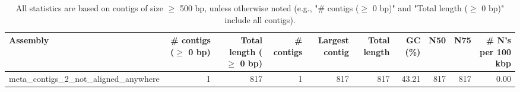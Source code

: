 \documentclass[12pt,a4paper]{article}
\begin{document}
\begin{table}[ht]
\begin{center}
\caption{All statistics are based on contigs of size $\geq$ 500 bp, unless otherwise noted (e.g., "\# contigs ($\geq$ 0 bp)" and "Total length ($\geq$ 0 bp)" include all contigs).}
\begin{tabular}{|l*{9}{|r}|}
\hline
Assembly & \# contigs ($\geq$ 0 bp) & Total length ($\geq$ 0 bp) & \# contigs & Largest contig & Total length & GC (\%) & N50 & N75 & \# N's per 100 kbp \\ \hline
meta\_contigs\_2\_not\_aligned\_anywhere & 1 & 817 & 1 & 817 & 817 & 43.21 & 817 & 817 & 0.00 \\ \hline
\end{tabular}
\end{center}
\end{table}
\end{document}
